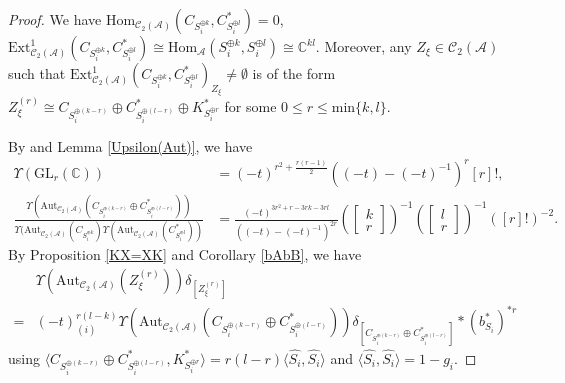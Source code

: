 \documentclass[12pt]{amsart}
\theoremstyle{definition}
\numberwithin{equation}{section}
\begin{document}
\begin{proof}
    We have $ \mathrm{Hom}_{\mathcal{C}_2(\mathcal{A})}(C_{S_i^{\oplus k}}, C_{S_i^{\oplus l}}^* ) = 0 $, $ \mathrm{Ext}^1_{\mathcal{C}_2(\mathcal{A})}(C_{S_i^{\oplus k}}, C_{S_i^{\oplus l}}^* ) \cong \mathrm{Hom}_{\mathcal{A}}(S_i^{\oplus k}, S_i^{\oplus l}) \cong \mathbb{C}^{kl}  $.
    Moreover, any $ Z_{\xi} \in \mathcal{C}_2(\mathcal{A}) $ such that $ \mathrm{Ext}^1_{\mathcal{C}_2(\mathcal{A})}(C_{S_i^{\oplus k}}, C_{S_i^{\oplus l}}^* )_{Z_{\xi}} \neq \emptyset $ is of the form $  Z_{\xi}^{(r)} \cong C_{S_i^{\oplus (k-r)}} \oplus C_{S_i^{\oplus (l-r)}}^* \oplus K_{S_i^{\oplus r}}^* $
    for some $ 0 \leqslant r \leqslant \mathrm{min}\{k,l\}$. 

    By \cite[Lemma 2.6]{Bridgeland12} and Lemma \ref{Upsilon(Aut)}, we have
    \begin{align*}
        \Upsilon(\mathrm{GL}_r(\mathbb{C})) &= (-t)^{r^2+\frac{r(r-1)}{2}}((-t)-(-t)^{-1})^r [r]!,\\
        \frac{\Upsilon(\mathrm{Aut}_{\mathcal{C}_2(\mathcal{A})}(C_{S_i^{\oplus (k-r)}} \oplus C_{S_i^{\oplus (l-r)}}^*)) }{\Upsilon(\mathrm{Aut}_{\mathcal{C}_2(\mathcal{A})}(C_{S_i^{\oplus k}})\Upsilon(\mathrm{Aut}_{\mathcal{C}_2(\mathcal{A})}(C_{S_i^{\oplus l}}^*))  } &= \frac{(-t)^{3r^2
        +r-3rk-3rl} }{((-t)-(-t)^{-1})^{2r}} (\begin{bmatrix}
            k \\ r
        \end{bmatrix})^{-1}
        (\begin{bmatrix}
            l \\ r
        \end{bmatrix})^{-1} ([r]!)^{-2}.
    \end{align*}    
    By Proposition \ref{KX=XK} and Corollary \ref{bAbB}, we have
    \begin{align*}
        &\Upsilon(\mathrm{Aut}_{\mathcal{C}_2(\mathcal{A})}(Z_{\xi}^{(r)})) \delta_{[Z_{\xi}^{(r)}]} \\
        =& (-t)_{(i)}^{r(l-k)}\Upsilon(\mathrm{Aut}_{\mathcal{C}_2(\mathcal{A})}(C_{S_i^{\oplus (k-r)}} \oplus C_{S_i^{\oplus (l-r)}}^*)) \delta_{[C_{S_i^{\oplus (k-r)}} \oplus C_{S_i^{\oplus (l-r)}}^*]} * (b_{S_i}^*)^{*r}
    \end{align*}
    using $ \langle C_{S_i^{\oplus (k-r)}} \oplus C_{S_i^{\oplus (l-r)}}^*,K_{S_i^{\oplus r}}^*\rangle = r(l-r)\langle \widehat{S_i},\widehat{S_i} \rangle  $ and $ \langle \widehat{S_i},\widehat{S_i} \rangle = 1-g_i $.


\end{proof}
\end{document}
